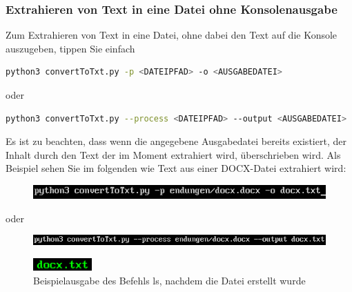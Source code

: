 \documentclass[12pt]{scrartcl}
\begin{document}
\subsubsection{Extrahieren von Text in eine Datei ohne Konsolenausgabe}
\label{sec:first-steps-extraction-file-without}
Zum Extrahieren von Text in eine Datei, ohne dabei den Text auf die Konsole auszugeben, tippen Sie einfach 
\begin{lstlisting}[language=bash]
python3 convertToTxt.py -p <DATEIPFAD> -o <AUSGABEDATEI>
\end{lstlisting}
\begin{center}
oder
\end{center}
\begin{lstlisting}[language=bash]
python3 convertToTxt.py --process <DATEIPFAD> --output <AUSGABEDATEI>
\end{lstlisting} 
Es ist zu beachten, dass wenn die angegebene Ausgabedatei bereits existiert, der Inhalt durch den Text der im Moment extrahiert wird, überschrieben wird. 
Als Beispiel sehen Sie im folgenden wie Text aus einer DOCX-Datei extrahiert wird:
\begin{figure}[htbp]
\includegraphics[width=1.0\textwidth]{ersteSchritteExtractIntoFileWithoutConsole001}\par\vspace{0.25cm}
\label{fig:ersteSchritteExtractIntoFileWithoutConsole001}
\end{figure}
\begin{center}
oder
\end{center}
\begin{figure}[htbp]
\includegraphics[width=1.0\textwidth]{ersteSchritteExtractIntoFileWithoutConsole002}\par

\vspace{0.25cm}
\label{fig:ersteSchritteExtractIntoFileWithoutConsole002}
\end{figure}
\begin{figure}[htbp]
\centering
\includegraphics[width=0.2\textwidth]{ersteSchritteExtractIntoFileWithoutConsole003}\par\vspace{0.25cm}
\caption{Beispielausgabe des Befehls ls, nachdem die Datei erstellt wurde}
\label{fig:ersteSchritteExtractIntoFileWithoutConsole003}
\end{figure}
\newpage
\end{document}
